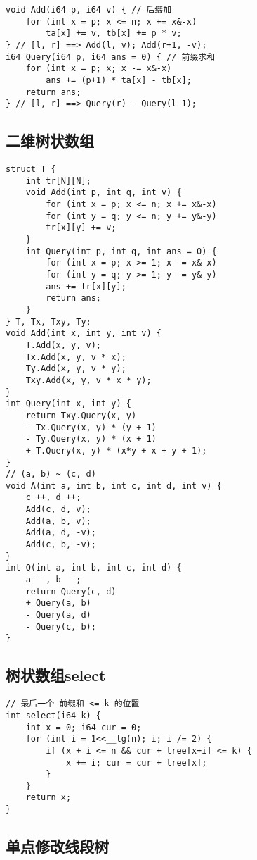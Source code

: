 \documentclass[a4paper,landscape,twocolumn]{ctexart}
\begin{document}
\begin{lstlisting}
void Add(i64 p, i64 v) { // 后缀加
	for (int x = p; x <= n; x += x&-x)
		ta[x] += v, tb[x] += p * v;
} // [l, r] ==> Add(l, v); Add(r+1, -v);
i64 Query(i64 p, i64 ans = 0) { // 前缀求和
	for (int x = p; x; x -= x&-x)
		ans += (p+1) * ta[x] - tb[x];
	return ans;
} // [l, r] ==> Query(r) - Query(l-1);
\end{lstlisting}

\subsection{二维树状数组}

\begin{lstlisting}
struct T {
	int tr[N][N];
	void Add(int p, int q, int v) {
		for (int x = p; x <= n; x += x&-x)
		for (int y = q; y <= n; y += y&-y)
		tr[x][y] += v;
	}
	int Query(int p, int q, int ans = 0) {
		for (int x = p; x >= 1; x -= x&-x)
		for (int y = q; y >= 1; y -= y&-y)
		ans += tr[x][y];
		return ans;
	}
} T, Tx, Txy, Ty;
void Add(int x, int y, int v) {
	T.Add(x, y, v);
	Tx.Add(x, y, v * x);
	Ty.Add(x, y, v * y);
	Txy.Add(x, y, v * x * y);
}
int Query(int x, int y) {
	return Txy.Query(x, y)
	- Tx.Query(x, y) * (y + 1)
	- Ty.Query(x, y) * (x + 1)
	+ T.Query(x, y) * (x*y + x + y + 1);
}
// (a, b) ~ (c, d)
void A(int a, int b, int c, int d, int v) {
	c ++, d ++;
	Add(c, d, v);
	Add(a, b, v);
	Add(a, d, -v);
	Add(c, b, -v);
}
int Q(int a, int b, int c, int d) {
	a --, b --;
	return Query(c, d)
	+ Query(a, b)
	- Query(a, d)
	- Query(c, b);
}
\end{lstlisting}

\subsection{树状数组select}

\begin{lstlisting}
// 最后一个 前缀和 <= k 的位置
int select(i64 k) {
	int x = 0; i64 cur = 0;
	for (int i = 1<<__lg(n); i; i /= 2) {
		if (x + i <= n && cur + tree[x+i] <= k) {
			x += i; cur = cur + tree[x];
		}
	}
	return x;
}
\end{lstlisting}

\subsection{单点修改线段树}
\end{document}
